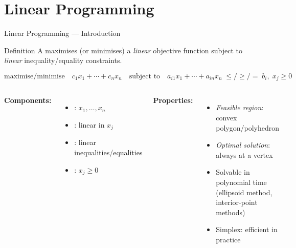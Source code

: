\documentclass[aspectratio=169]{beamer}
\begin{document}
\section{Linear Programming}

\begin{frame}[shrink=12]{Linear Programming — Introduction}
  \begin{block}{Definition}
    A  maximises (or minimises) a
    \emph{linear} objective function subject to \emph{linear}
    inequality/equality constraints.
  \end{block}

  \[
    \text{maximise/minimise}\quad c_1x_1 + \cdots + c_nx_n
    \quad\text{subject to}\quad
    a_{i1}x_1 + \cdots + a_{in}x_n \;\leq/\geq/=\; b_i,\;
    x_j \geq 0
  \]
 
  \begin{columns}[T]
      \textbf{Components:}
      \begin{itemize}
        \item {}: $x_1,\ldots,x_n$
        \item {}: linear in $x_j$
        \item {}: linear inequalities/equalities
        \item {}: $x_j \geq 0$
      \end{itemize}
      \textbf{Properties:}
      \begin{itemize}
        \item \emph{Feasible region}: convex polygon/polyhedron
        \item \emph{Optimal solution}: always at a vertex
        \item Solvable in polynomial time (ellipsoid method,
              interior-point methods)
        \item Simplex: efficient in practice
      \end{itemize}
  \end{columns}
\end{frame}
\end{document}
